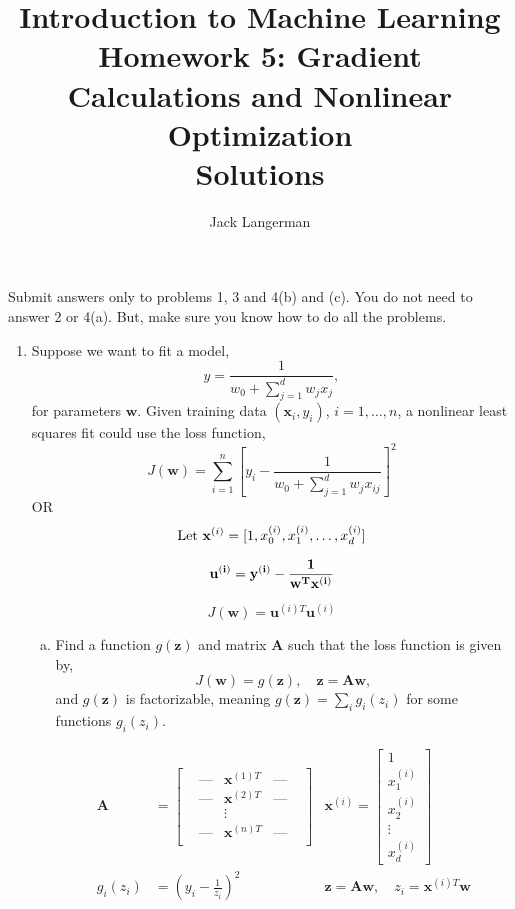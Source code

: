 \documentclass[11pt]{article}
\newcommand{\ubf}{\mathbf{u}}
\newcommand{\wbf}{\mathbf{w}}
\newcommand{\xbf}{\mathbf{x}}
\newcommand{\zbf}{\mathbf{z}}
\newcommand{\Abf}{\mathbf{A}}
\begin{document}
\title{Introduction to Machine Learning\\
Homework 5:  Gradient Calculations and Nonlinear Optimization\\Solutions}
\author{Jack Langerman}
\date{}

\maketitle

Submit answers only to problems 1, 3 and 4(b) and (c).  You do not need to answer 2 or 4(a).
But, make sure you know how to do all the problems.

\begin{enumerate}

\item Suppose we want to fit a model,
\[
    \hat{y} = \frac{1}{w_0 + \sum_{j=1}^d w_jx_j},
\]
for parameters $\wbf$. Given training data $(\xbf_i,y_i)$, $i=1,\ldots,n$,
a nonlinear least squares fit could use the loss function,
\[
    J(\wbf) = \sum_{i=1}^n \left[y_i -
        \frac{1}{w_0 + \sum_{j=1}^d w_jx_{ij}}\right]^2
\]
OR
\[
	\text{Let } \xbf^{(i)} = 
    	[1, x_0^{(i)}, x_1^{(i)}, \hdots, x_d^{(i)}] \\
\]

\[
\bf{u}^{(i)} = y^{(i)} - \frac{1}{\wbf^T \xbf^{(i)}}
\]

\[
    J(\wbf) = \ubf^{(i)T} \ubf^{(i)}
\]

\newpage
\begin{enumerate}[(a)]
\item Find a function $g(\zbf)$ and matrix $\Abf$ such that
the loss function is given by,
\[
    J(\wbf) = g(\zbf), \quad \zbf = \Abf\wbf,
\]
and $g(\zbf)$ is factorizable, meaning $g(\zbf) = \sum_i g_i(z_i)$ for
some functions $g_i(z_i)$.

\begin{align*}
	\Abf &= \begin{bmatrix}
                 & \text{---}  & \xbf^{(1)T} & \text{---} & \\
                 & \text{---}  & \xbf^{(2)T} & \text{---} & \\
                 &  & \vdots  &    \\
                 & \text{---}  & \xbf^{(n)T} & \text{---} & \\
		     \end{bmatrix}
    & \xbf^{(i)} = \begin{bmatrix}
      	 		1 \\ x^{(i)}_1 \\ x^{(i)}_2 \\ \vdots \\ x^{(i)}_d 
                  \end{bmatrix} \\
     g_i(z_i) &= \left( y_i - \frac{1}{z_i} \right)^2 
	 & \zbf = \Abf \wbf, \quad z_i = \xbf^{(i)T} \wbf \\
\end{align*}
		


\end{enumerate}
\end{enumerate}
\end{document}

